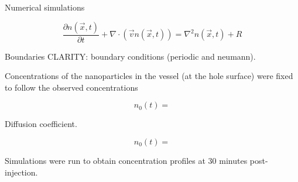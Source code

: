 Numerical simulations

\begin{equation}\label{diffusion}
		\frac{\partial n(\vec{x},t)}{\partial t} + {\nabla \cdot (\vec{v}n(\vec{x},t))} = \nabla^2n(\vec{x},t) + R
\end{equation}

Boundaries CLARITY: boundary conditions (periodic and neumann).

Concentrations of the nanoparticles in the vessel (at the hole surface) were fixed to follow the observed concentrations

\begin{equation}\label{conc_time}
		n_0(t) = 
\end{equation}

Diffusion coefficient.

\begin{equation}\label{conc_time}
		n_0(t) = 
\end{equation}

Simulations were run to obtain concentration profiles at 30 minutes post-injection.